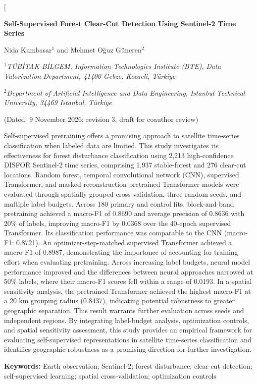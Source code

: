 \documentclass[10pt,a4paper,twocolumn]{article}
\renewenvironment{abstract}{\small\begin{center}\begin{minipage}{0.86\textwidth}}{\end{minipage}\end{center}\vspace{6pt}}
\begin{document}
\twocolumn[{
\begin{@twocolumnfalse}
\begin{center}
{\large\bfseries Self-Supervised Forest Clear-Cut Detection Using Sentinel-2 Time Series\par}
\vspace{10pt}
{\normalsize Nida Kumbasar$^{1}$ and Mehmet Oğuz Güneren$^{2}$\par}
\vspace{3pt}
{\small\itshape $^{1}$TÜBİTAK BİLGEM, Information Technologies Institute (BTE), Data Valorization Department, 41400 Gebze, Kocaeli, Türkiye\par}
{\small\itshape $^{2}$Department of Artificial Intelligence and Data Engineering, Istanbul Technical University, 34469 Istanbul, Türkiye\par}
\vspace{3pt}
{\small (Dated: 9 November 2026; revision 3, draft for coauthor review)\par}
\end{center}
\vspace{4pt}
\begin{abstract}
Self-supervised pretraining offers a promising approach to satellite time-series classification when labeled data are limited. This study investigates its effectiveness for forest disturbance classification using 2,213 high-confidence DISFOR Sentinel-2 time series, comprising 1,937 stable-forest and 276 clear-cut locations. Random forest, temporal convolutional network (CNN), supervised Transformer, and masked-reconstruction pretrained Transformer models were evaluated through spatially grouped cross-validation, three random seeds, and multiple label budgets. Across 180 primary and control fits, block-and-band pretraining achieved a macro-F1 of 0.8690 and average precision of 0.8636 with 20\% of labels, improving macro-F1 by 0.0368 over the 40-epoch supervised Transformer. Its classification performance was comparable to the CNN (macro-F1: 0.8721). An optimizer-step-matched supervised Transformer achieved a macro-F1 of 0.8987, demonstrating the importance of accounting for training effort when evaluating pretraining. Across increasing label budgets, neural model performance improved and the differences between neural approaches narrowed at 50\% labels, where their macro-F1 scores fell within a range of 0.0193. In a spatial sensitivity analysis, the pretrained Transformer achieved the highest macro-F1 at a 20 km grouping radius (0.8437), indicating potential robustness to greater geographic separation. This result warrants further evaluation across seeds and independent regions. By integrating label-budget analysis, optimization controls, and spatial sensitivity assessment, this study provides an empirical framework for evaluating self-supervised representations in satellite time-series classification and identifies geographic robustness as a promising direction for further investigation.\par\vspace{4pt}\noindent\textbf{Keywords:} Earth observation; Sentinel-2; forest disturbance; clear-cut detection; self-supervised learning; spatial cross-validation; optimization controls

\end{abstract}
\end{@twocolumnfalse}}
\end{document}
